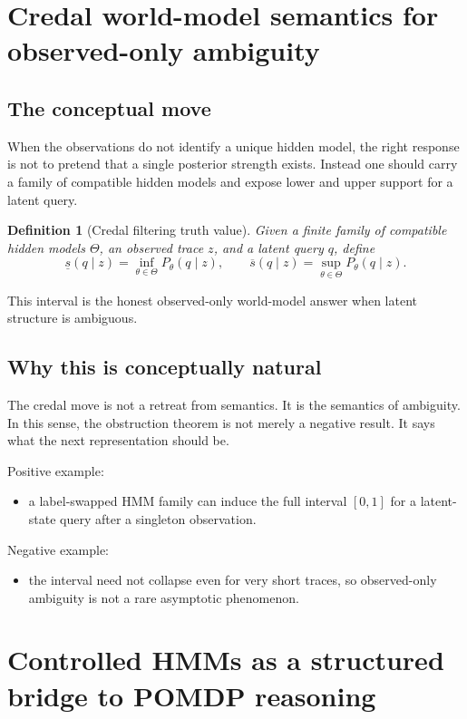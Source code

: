 \documentclass[11pt]{article}
\newtheorem{definition}{Definition}
\begin{document}
\section{Credal world-model semantics for observed-only ambiguity}

\subsection{The conceptual move}

When the observations do not identify a unique hidden model, the right response
is not to pretend that a single posterior strength exists.  Instead one should
carry a family of compatible hidden models and expose lower and upper support
for a latent query.

\begin{definition}[Credal filtering truth value]
Given a finite family of compatible hidden models $\Theta$, an observed trace
$z$, and a latent query $q$, define
\[
\underline{s}(q \mid z) = \inf_{\theta \in \Theta} P_\theta(q \mid z), \qquad
\overline{s}(q \mid z) = \sup_{\theta \in \Theta} P_\theta(q \mid z).
\]
\end{definition}

This interval is the honest observed-only world-model answer when latent
structure is ambiguous.

\subsection{Why this is conceptually natural}

The credal move is not a retreat from semantics.  It is the semantics of
ambiguity.  In this sense, the obstruction theorem is not merely a negative
result.  It says what the next representation should be.

Positive example:
\begin{itemize}
  \item a label-swapped HMM family can induce the full interval $[0,1]$ for a
        latent-state query after a singleton observation.
\end{itemize}

Negative example:
\begin{itemize}
  \item the interval need not collapse even for very short traces, so
        observed-only ambiguity is not a rare asymptotic phenomenon.
\end{itemize}

\section{Controlled HMMs as a structured bridge to POMDP reasoning}
\end{document}
